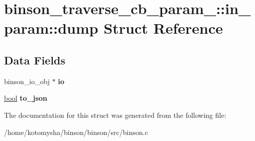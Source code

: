 \hypertarget{structbinson__traverse__cb__param___1_1in__param_1_1dump}{\section{binson\-\_\-traverse\-\_\-cb\-\_\-param\-\_\-\-:\-:in\-\_\-param\-:\-:dump Struct Reference}
\label{structbinson__traverse__cb__param___1_1in__param_1_1dump}
}
\subsection*{Data Fields}
\begin{DoxyCompactItemize}
\item 
\hypertarget{structbinson__traverse__cb__param___1_1in__param_1_1dump_af8fb45d5b549d58d1c4fd0216a2b2464}{binson\-\_\-io\-\_\-obj $\ast$ {\bfseries io}}\label{structbinson__traverse__cb__param___1_1in__param_1_1dump_af8fb45d5b549d58d1c4fd0216a2b2464}

\item 
\hypertarget{structbinson__traverse__cb__param___1_1in__param_1_1dump_a90e966c08122c230736220bb0d9314b0}{\hyperlink{binson__config_8h_abb452686968e48b67397da5f97445f5b}{bool} {\bfseries to\-\_\-json}}\label{structbinson__traverse__cb__param___1_1in__param_1_1dump_a90e966c08122c230736220bb0d9314b0}

\end{DoxyCompactItemize}


The documentation for this struct was generated from the following file\-:\begin{DoxyCompactItemize}
\item 
/home/kotomysha/binson/binson/src/binson.\-c\end{DoxyCompactItemize}
